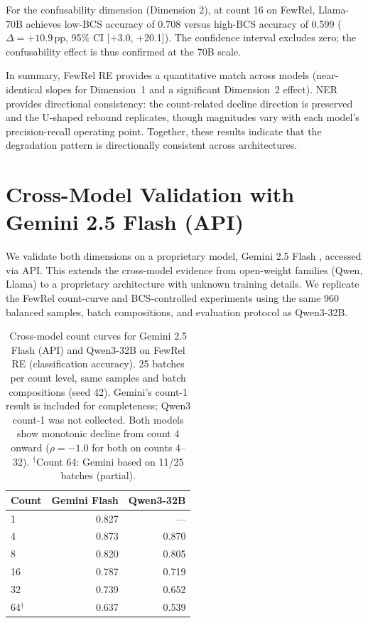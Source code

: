 \documentclass[11pt]{article}
\begin{document}
For the confusability dimension (Dimension 2), at count 16 on FewRel, Llama-70B achieves low-BCS accuracy of 0.708 versus high-BCS accuracy of 0.599 ($\Delta = +10.9$\,pp, 95\% CI [$+$3.0, $+$20.1]). The confidence interval excludes zero; the confusability effect is thus confirmed at the 70B scale.

In summary, FewRel RE provides a quantitative match across models (near-identical slopes for Dimension~1 and a significant Dimension~2 effect). NER provides directional consistency: the count-related decline direction is preserved and the U-shaped rebound replicates, though magnitudes vary with each model's precision-recall operating point. Together, these results indicate that the degradation pattern is directionally consistent across architectures.

\section{Cross-Model Validation with Gemini 2.5 Flash (API)}
\label{sec:appendix_cross_model_gemini}

We validate both dimensions on a proprietary model, Gemini 2.5 Flash \citep{gemini-2025}, accessed via API. This extends the cross-model evidence from open-weight families (Qwen, Llama) to a proprietary architecture with unknown training details. We replicate the FewRel count-curve and BCS-controlled experiments using the same 960 balanced samples, batch compositions, and evaluation protocol as Qwen3-32B.

\begin{table}[h]
\centering
\small
\caption{Cross-model count curves for Gemini 2.5 Flash (API) and Qwen3-32B on FewRel RE (classification accuracy). 25 batches per count level, same samples and batch compositions (seed 42). Gemini's count-1 result is included for completeness; Qwen3 count-1 was not collected. Both models show monotonic decline from count 4 onward ($\rho = -1.0$ for both on counts 4--32). $^\dagger$Count 64: Gemini based on 11/25 batches (partial).}
\label{tab:cross_model_gemini}
\begin{tabular}{lrr}
\toprule
\textbf{Count} & \textbf{Gemini Flash} & \textbf{Qwen3-32B} \\
\midrule
1  & 0.827 & --- \\
4  & 0.873 & 0.870 \\
8  & 0.820 & 0.805 \\
16 & 0.787 & 0.719 \\
32 & 0.739 & 0.652 \\
64$^\dagger$ & 0.637 & 0.539 \\
\bottomrule
\end{tabular}
\end{table}
\end{document}
